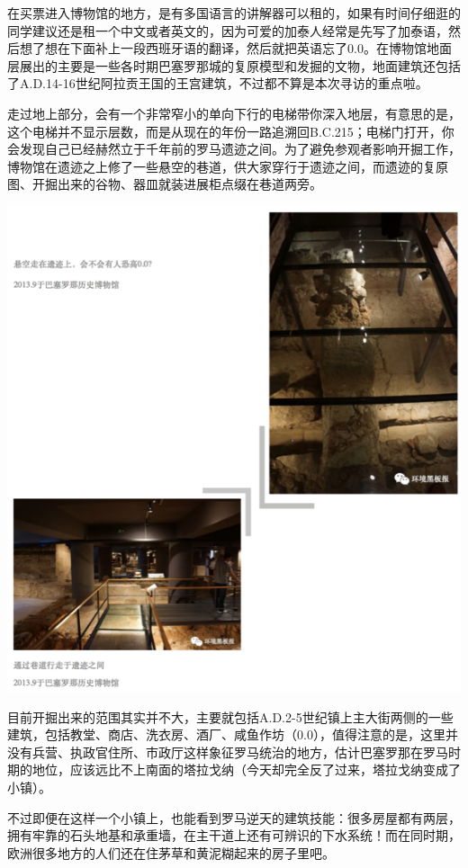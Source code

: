 \documentclass[]{book}
\begin{document}
在买票进入博物馆的地方，是有多国语言的讲解器可以租的，如果有时间仔细逛的同学建议还是租一个中文或者英文的，因为可爱的加泰人经常是先写了加泰语，然后想了想在下面补上一段西班牙语的翻译，然后就把英语忘了0.0。在博物馆地面层展出的主要是一些各时期巴塞罗那城的复原模型和发掘的文物，地面建筑还包括了A.D.14-16世纪阿拉贡王国的王宫建筑，不过都不算是本次寻访的重点啦。

走过地上部分，会有一个非常窄小的单向下行的电梯带你深入地层，有意思的是，这个电梯并不显示层数，而是从现在的年份一路追溯回B.C.215；电梯门打开，你会发现自己已经赫然立于千年前的罗马遗迹之间。为了避免参观者影响开掘工作，博物馆在遗迹之上修了一些悬空的巷道，供大家穿行于遗迹之间，而遗迹的复原图、开掘出来的谷物、器皿就装进展柜点缀在巷道两旁。

\includegraphics[width=7.78in]{images/xt15}

目前开掘出来的范围其实并不大，主要就包括A.D.2-5世纪镇上主大街两侧的一些建筑，包括教堂、商店、洗衣房、酒厂、咸鱼作坊（0.0），值得注意的是，这里并没有兵营、执政官住所、市政厅这样象征罗马统治的地方，估计巴塞罗那在罗马时期的地位，应该远比不上南面的塔拉戈纳（今天却完全反了过来，塔拉戈纳变成了小镇）。

不过即便在这样一个小镇上，也能看到罗马逆天的建筑技能：很多房屋都有两层，拥有牢靠的石头地基和承重墙，在主干道上还有可辨识的下水系统！而在同时期，欧洲很多地方的人们还在住茅草和黄泥糊起来的房子里吧。
\end{document}
